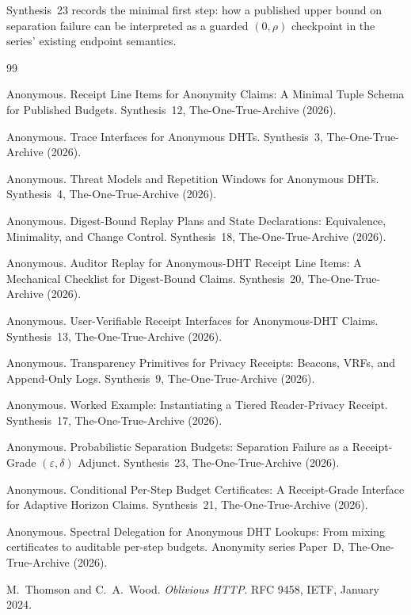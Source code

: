 \documentclass[11pt]{article}
\begin{document}
Synthesis~23 records the minimal first step: how a published upper bound on separation failure can be interpreted as a guarded $(0,\rho)$ checkpoint in the series' existing endpoint semantics.\cite{series:probsep}

\begin{thebibliography}{99}\small

Anonymous.
\newblock Receipt Line Items for Anonymity Claims: A Minimal Tuple Schema for Published Budgets.
\newblock Synthesis~12, The-One-True-Archive (2026).

Anonymous.
\newblock Trace Interfaces for Anonymous DHTs.
\newblock Synthesis~3, The-One-True-Archive (2026).

Anonymous.
\newblock Threat Models and Repetition Windows for Anonymous DHTs.
\newblock Synthesis~4, The-One-True-Archive (2026).

Anonymous.
\newblock Digest-Bound Replay Plans and State Declarations: Equivalence, Minimality, and Change Control.
\newblock Synthesis~18, The-One-True-Archive (2026).

Anonymous.
\newblock Auditor Replay for Anonymous-DHT Receipt Line Items: A Mechanical Checklist for Digest-Bound Claims.
\newblock Synthesis~20, The-One-True-Archive (2026).

Anonymous.
\newblock User-Verifiable Receipt Interfaces for Anonymous-DHT Claims.
\newblock Synthesis~13, The-One-True-Archive (2026).

Anonymous.
\newblock Transparency Primitives for Privacy Receipts: Beacons, VRFs, and Append-Only Logs.
\newblock Synthesis~9, The-One-True-Archive (2026).

Anonymous.
\newblock Worked Example: Instantiating a Tiered Reader-Privacy Receipt.
\newblock Synthesis~17, The-One-True-Archive (2026).

Anonymous.
\newblock Probabilistic Separation Budgets: Separation Failure as a Receipt-Grade $(\varepsilon,\delta)$ Adjunct.
\newblock Synthesis~23, The-One-True-Archive (2026).

Anonymous.
\newblock Conditional Per-Step Budget Certificates: A Receipt-Grade Interface for Adaptive Horizon Claims.
\newblock Synthesis~21, The-One-True-Archive (2026).

Anonymous.
\newblock Spectral Delegation for Anonymous DHT Lookups: From mixing certificates to auditable per-step budgets.
\newblock Anonymity series Paper~D, The-One-True-Archive (2026).

M.~Thomson and C.~A.~Wood.
\newblock \emph{Oblivious HTTP}.
\newblock RFC 9458, IETF, January 2024.

\end{thebibliography}
\end{document}
